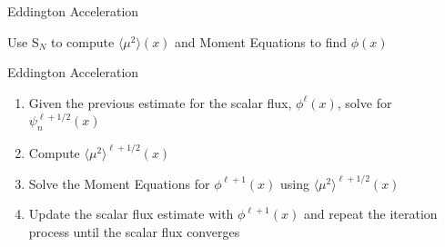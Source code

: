 \documentclass[10pt]{beamer}
\newcommand{\SN}{S$_N$\xspace}
\newcommand{\edd}{\langle \mu^2 \rangle}
\begin{document}
\begin{frame}{Eddington Acceleration}

    Use \SN to compute $\edd(x)$ and Moment Equations to find $\phi(x)$ 

    \begin{exampleblock}{Eddington Acceleration}
    \begin{enumerate}
        \item Given the previous estimate for the scalar flux, $\phi^{\ell}(x)$, solve for $\psi_n^{\ell+1/2}(x)$

        \item \alert{Compute $\edd^{\ell+1/2}(x)$ }

        \item \alert{Solve the Moment Equations for $\phi^{\ell+1}(x)$ 
        	using $\edd^{\ell+1/2}(x)$} 

        \item Update the scalar flux estimate with $\phi^{\ell+1}(x)$ and repeat the iteration process until the scalar flux converges
    \end{enumerate}
    \end{exampleblock}

\end{frame}
\end{document}
